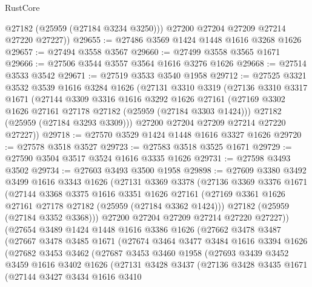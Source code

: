 \begin{lexlean}{RustCore}
\begin{coremodule}
          @27182
          (@25959 (@27184 @3234 @3250)))
        @27200
        @27204
        @27209
        @27214
        @27220
        @27227))
@29655 := @27486 @3569 @1424 @1448 @1616 @3268 @1626
@29657 := @27494 @3558 @3567
@29660 := @27499 @3558 @3565 @1671
@29666 := @27506 @3544 @3557 @3564 @1616 @3276 @1626
@29668 := @27514 @3533 @3542
@29671 := @27519 @3533 @3540 @1958
@29712 := @27525
    @3321
    @3532
    @3539
    @1616
    @3284
    @1626
    (@27131
      @3310
      @3319
      (@27136
        @3310
        @3317
        @1671
        (@27144
          @3309
          @3316
          @1616
          @3292
          @1626
          @27161
          (@27169 @3302 @1626 @27161 @27178 @27182 (@25959 (@27184 @3303 @1424)))
          @27182
          (@25959 (@27184 @3293 @3309)))
        @27200
        @27204
        @27209
        @27214
        @27220
        @27227))
@29718 := @27570 @3529 @1424 @1448 @1616 @3327 @1626
@29720 := @27578 @3518 @3527
@29723 := @27583 @3518 @3525 @1671
@29729 := @27590 @3504 @3517 @3524 @1616 @3335 @1626
@29731 := @27598 @3493 @3502
@29734 := @27603 @3493 @3500 @1958
@29898 := @27609
    @3380
    @3492
    @3499
    @1616
    @3343
    @1626
    (@27131
      @3369
      @3378
      (@27136
        @3369
        @3376
        @1671
        (@27144
          @3368
          @3375
          @1616
          @3351
          @1626
          @27161
          (@27169 @3361 @1626 @27161 @27178 @27182 (@25959 (@27184 @3362 @1424)))
          @27182
          (@25959 (@27184 @3352 @3368)))
        @27200
        @27204
        @27209
        @27214
        @27220
        @27227))
    (@27654
      @3489
      @1424
      @1448
      @1616
      @3386
      @1626
      (@27662
        @3478
        @3487
        (@27667
          @3478
          @3485
          @1671
          (@27674
            @3464
            @3477
            @3484
            @1616
            @3394
            @1626
            (@27682
              @3453
              @3462
              (@27687
                @3453
                @3460
                @1958
                (@27693
                  @3439
                  @3452
                  @3459
                  @1616
                  @3402
                  @1626
                  (@27131
                    @3428
                    @3437
                    (@27136
                      @3428
                      @3435
                      @1671
                      (@27144
                        @3427
                        @3434
                        @1616
                        @3410

\end{coremodule}
\end{lexlean}
